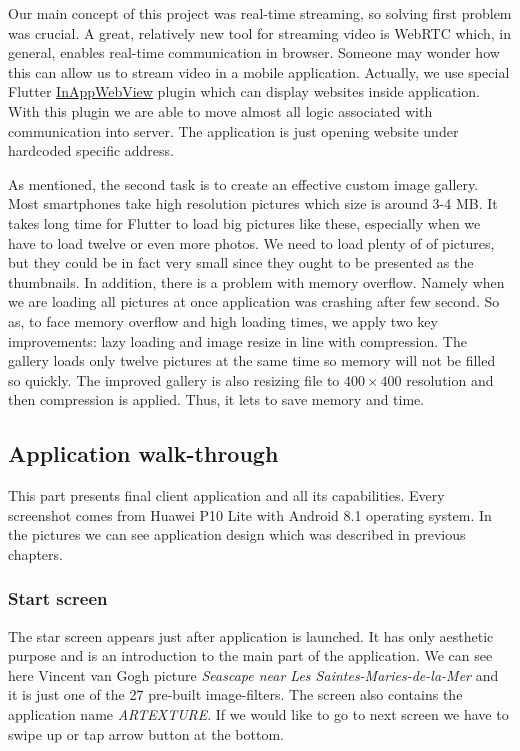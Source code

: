 \documentclass[../Main.tex]{subfiles}
\begin{document}
Our main concept of this project was real-time streaming, so solving first problem was crucial.
A great, relatively new tool for streaming video is WebRTC which, in general, enables real-time communication in browser. 
Someone may wonder how this can allow us to stream video in a mobile application.
Actually, we use special Flutter \href{https://pub.dev/packages/flutter_inappwebview}{InAppWebView} plugin which can display websites inside application.
With this plugin we are able to move almost all logic associated with communication into server.
The application is just opening website under hardcoded specific address.

As mentioned, the second task is to create an effective custom image gallery. 
Most smartphones take high resolution pictures which size is around 3-4 MB.
It takes long time for Flutter to load big pictures like these, especially when
we have to load twelve or even more photos. We need to load plenty of of pictures, but they could be in fact very small since they ought to be presented as the thumbnails.
In addition, there is a problem with 
memory overflow. Namely when we are loading all pictures at once application was
crashing after few second. 
So as, to face memory overflow and high loading times, we apply two key improvements:
lazy loading and image resize in line with compression.
The gallery loads only twelve pictures at the same time so memory will not be filled so quickly.
The improved gallery is also resizing file to $400\times400$ resolution and then compression is applied.
Thus, it lets to save memory and time.


\subsection{Application walk-through}
This part presents final client application and all its capabilities.
Every screenshot comes from Huawei P10 Lite with Android 8.1 operating system. In the pictures we can see application design which was described in previous chapters.

\subsubsection{Start screen}
The star screen appears just after application is launched. It has only aesthetic purpose and is an introduction to the main part of the application. We can see here Vincent van Gogh picture \textit{Seascape near Les Saintes-Maries-de-la-Mer} and it is just one of the 27 pre-built image-filters. The screen also contains the application name \textit{ARTEXTURE}. If we would like to go to next screen we have to swipe up or tap arrow button at the bottom.
\end{document}
